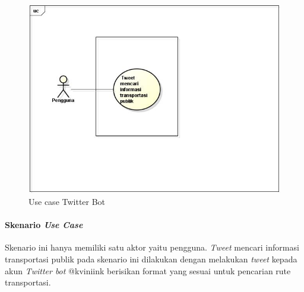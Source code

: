 \begin{figure}[htbp]
	\centering
		\includegraphics{Gambar/usecase.jpg}
	\caption{Use case Twitter Bot}
	\label{fig:usecase}
\end{figure}

\paragraph{Skenario \textit{Use Case}}
Skenario ini hanya memiliki satu aktor yaitu pengguna. \textit{Tweet} mencari informasi transportasi publik pada skenario ini dilakukan dengan melakukan \textit{tweet} kepada akun \textit{Twitter bot} @kviniink berisikan format yang sesuai untuk pencarian rute transportasi. 

